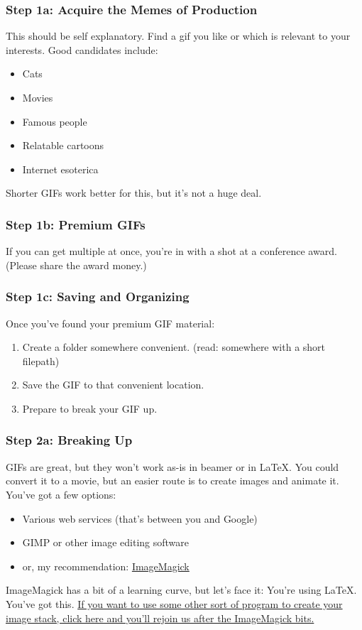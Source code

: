 \documentclass{beamer}
\begin{document}
\begin{frame}
	\frametitle{Step 1a: Acquire the Memes of Production}
	This should be self explanatory. Find a gif you like or which is relevant to your interests. Good candidates include:
		\begin{itemize}
			\item Cats
			\item Movies
			\item Famous people
			\item Relatable cartoons
			\item Internet esoterica
		\end{itemize}
	Shorter GIFs work better for this, but it's not a huge deal.
\end{frame}

\begin{frame}
	\frametitle{Step 1b: Premium GIFs}
	If you can get multiple at once, you're in with a shot at a conference award. (Please share the award money.)
	\begin{center}
	\end{center}
	\end{frame}

\begin{frame}
	\frametitle{Step 1c: Saving and Organizing}
	Once you've found your premium GIF material:
		\begin{enumerate}
			\item Create a folder somewhere convenient. (read: somewhere with a short filepath)
			\item Save the GIF to that convenient location.
			\item Prepare to break your GIF up.
		\end{enumerate}
\end{frame}

\begin{frame}
	\frametitle{Step 2a: Breaking Up}
	GIFs are great, but they won't work as-is in beamer or in \LaTeX. You could convert it to a movie, but an easier route  is to create images and animate it. You've got a few options:
		\begin{itemize}
			\item Various web services (that's between you and Google)
			\item GIMP or other image editing software
			\item or, my recommendation: \href{https://www.imagemagick.org/script/binary-releases.php}{ImageMagick}
		\end{itemize}
	ImageMagick has a bit of a learning curve, but let's face it: You're using \LaTeX. You've got this. \href{}{If you want to use some other sort of program to create your image stack, click here and you'll rejoin us after the ImageMagick bits.}
\end{frame}
\end{document}
